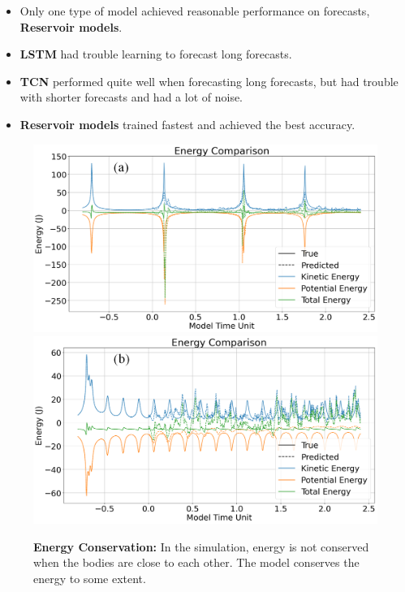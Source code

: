 \documentclass[%
 reprint,
 amsmath,amssymb,
 aps,
]{revtex4-2}
\begin{document}
\begin{itemize}
\item Only one type of model achieved reasonable performance on forecasts, \textbf{Reservoir models}.
\item \textbf{LSTM} had trouble learning to forecast long forecasts.
\item \textbf{TCN} performed quite well when forecasting long forecasts, but had trouble with shorter forecasts and had a lot of noise.
\item \textbf{Reservoir models} trained fastest and achieved the best accuracy.
\end{itemize}

\begin{figure}
    \centering
    \includegraphics[width=0.497\linewidth]{plot_1_Energy_Reservoir_marked.png}
    \includegraphics[width=0.497\linewidth]{plot_3_Energy_Reservoir_marked.png}
    \caption{\textbf{Energy Conservation:} In the simulation, energy is not conserved when the bodies are close to each other. The model conserves the energy to some extent.}
    \label{fig:energy}
\end{figure}
\end{document}

